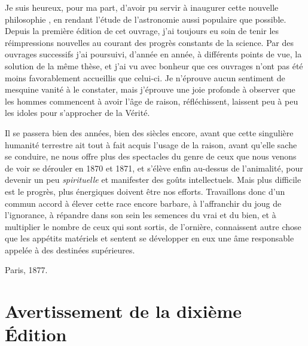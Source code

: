 \documentclass[a4paper, 11pt, oneside, landscape]{article}
\begin{document}
Je suis heureux, pour ma part, d'avoir pu servir à inaugurer cette nouvelle philosophie , en rendant l'étude de l'astronomie aussi populaire que possible. Depuis la première édition de cet ouvrage, j'ai toujours eu soin de tenir les réimpressions nouvelles au courant des progrès constants de la science. Par des ouvrages successifs j'ai poursuivi, d'année en année, à différents points de vue, la solution de la même thèse, et j'ai vu avec bonheur que ces ouvrages n'ont pas été moins favorablement accueillis que celui-ci. Je n'éprouve aucun sentiment de mesquine vanité à le constater, mais j'éprouve une joie profonde à observer que les hommes commencent à avoir l'âge de raison, réfléchissent, laissent peu à peu les idoles pour s'approcher de la Vérité.

Il se passera bien des années, bien des siècles encore, avant que cette singulière humanité terrestre ait tout à fait acquis l'usage de la raison, avant qu'elle sache se conduire, ne nous offre plus des spectacles du genre de ceux que nous venons de voir se dérouler en 1870 et 1871, et s'élève enfin au-dessus de l'animalité, pour devenir un peu \emph{spirituelle} et manifester des goûts intellectuels. Mais plus difficile est le progrès, plus énergiques doivent être nos efforts. Travaillons donc d'un commun accord à élever cette race encore barbare, à l'affranchir du joug de l'ignorance, à répandre dans son sein les semences du vrai et du bien, et à multiplier le nombre de ceux qui sont sortis, de l'ornière, connaissent autre chose que les appétits matériels et sentent se développer en eux une âme responsable appelée à des destinées supérieures.

\bigskip

Paris, 1877.
\clearpage
\section*{Avertissement de la dixième Édition}
\end{document}
